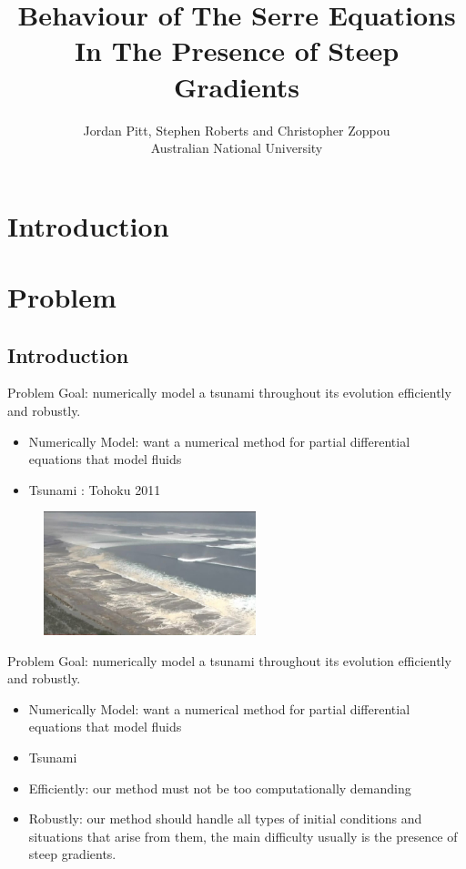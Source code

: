 \documentclass[pdf]{beamer}
\title{Behaviour of The Serre Equations In The Presence of Steep Gradients}
\author{Jordan Pitt, Stephen Roberts and Christopher Zoppou \\ Australian National University}
\begin{document}
\section{Introduction}
\begin{frame}
\titlepage
\end{frame}

\section{Problem}
\subsection{Introduction}
\begin{frame}{Problem}
Goal: numerically model a tsunami throughout its evolution efficiently and robustly.
\begin{itemize}
\pause
\item Numerically Model: want a numerical method for partial differential equations that model fluids
\pause
\item Tsunami
\pause
 : Tohoku 2011
\end{itemize}
\begin{figure}
	\includegraphics[width=0.55\textwidth]{../Pics/Web/1.jpg}
\end{figure}


\end{frame}

\begin{frame}{Problem}
	Goal: numerically model a tsunami throughout its evolution efficiently and robustly.
	\begin{itemize}
		\item Numerically Model: want a numerical method for partial differential equations that model fluids
		\item Tsunami
		\item Efficiently: our method must not be too computationally demanding
		\pause
		\item Robustly: our method should handle all types of initial conditions and situations that arise from them, the main difficulty usually is the presence of steep gradients. 
	\end{itemize}
	
\end{frame}
\end{document}

